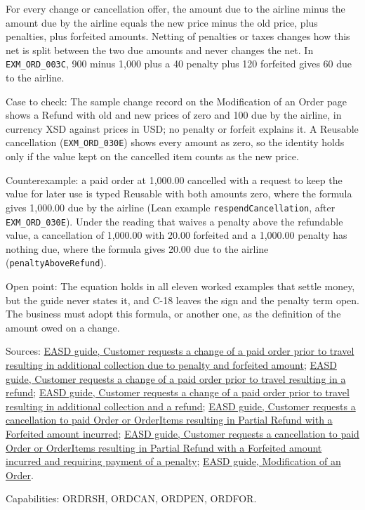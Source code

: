 \begin{theorem}
  \label{thm:change-cancellation-due-net-identity}
  For every change or cancellation offer, the amount due to the airline
  minus the amount due by the airline equals the new price minus the old
  price, plus penalties, plus forfeited amounts. Netting of penalties or
  taxes changes how this net is split between the two due amounts and never
  changes the net. In \texttt{EXM\_ORD\_003C}, 900 minus 1,000 plus a 40
  penalty plus 120 forfeited gives 60 due to the airline.

  Case to check: The sample change record on the Modification of an Order
  page shows a Refund with old and new prices of zero and 100 due by the
  airline, in currency XSD against prices in USD; no penalty or forfeit
  explains it. A Reusable cancellation (\texttt{EXM\_ORD\_030E}) shows every
  amount as zero, so the identity holds only if the value kept on the
  cancelled item counts as the new price.

  Counterexample: a paid order at 1,000.00 cancelled with a request to keep
  the value for later use is typed Reusable with both amounts zero, where the
  formula gives 1,000.00 due by the airline (Lean example
  \texttt{respendCancellation}, after \texttt{EXM\_ORD\_030E}).  Under the
  reading that waives a penalty above the refundable value, a cancellation of
  1,000.00 with 20.00 forfeited and a 1,000.00 penalty has nothing due, where
  the formula gives 20.00 due to the airline (\texttt{penaltyAboveRefund}).

  Open point: The equation holds in all eleven worked examples that settle
  money, but the guide never states it, and C-18 leaves the sign and the
  penalty term open. The business must adopt this formula, or another one,
  as the definition of the amount owed on a change.

  Sources: \href{https://standards.atlassian.net/wiki/spaces/EASD/pages/842268745}{EASD guide, Customer requests a change of a paid order prior to travel resulting in additional collection due to penalty and forfeited amount};
  \href{https://standards.atlassian.net/wiki/spaces/EASD/pages/842268768}{EASD guide, Customer requests a change of a paid order prior to travel resulting in a refund};
  \href{https://standards.atlassian.net/wiki/spaces/EASD/pages/842301447}{EASD guide, Customer requests a change of a paid order prior to travel resulting in additional collection and a refund};
  \href{https://standards.atlassian.net/wiki/spaces/EASD/pages/817594543}{EASD guide, Customer requests a cancellation to paid Order or OrderItems resulting in Partial Refund with a Forfeited amount incurred};
  \href{https://standards.atlassian.net/wiki/spaces/EASD/pages/817594795}{EASD guide, Customer requests a cancellation to paid Order or OrderItems resulting in Partial Refund with a Forfeited amount incurred and requiring payment of a penalty};
  \href{https://standards.atlassian.net/wiki/spaces/EASD/pages/574619782}{EASD guide, Modification of an Order}.

  Capabilities: ORDRSH, ORDCAN, ORDPEN, ORDFOR.
\end{theorem}
